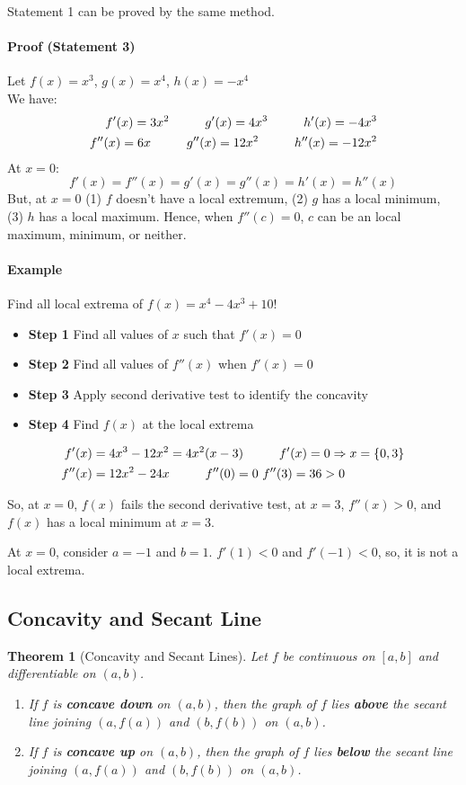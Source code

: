 \documentclass[12pt]{article}
\newcommand\tab[1][1cm]{\hspace*{#1}}
\newtheorem{theorem}{Theorem}
\begin{document}
Statement 1 can be proved by the same method.

\paragraph{Proof (Statement 3)}
Let $f(x) = x^3$, $g(x) = x^4$, $h(x) = -x^4$\\
We have:
\begin{align*} 
     f'(x) = 3x^2 \textrm{\tab} g'(x) = 4x^3 \textrm{\tab} h'(x) = -4x^3 \\
     f''(x) = 6x \textrm{\tab} g''(x) = 12x^2 \textrm{\tab} h''(x) = - 12x^2 \\
\end{align*}
At $x = 0$:
\[
    f'(x) = f''(x) = g'(x) = g''(x) = h'(x) = h''(x)
\]
But, at $x = 0$ (1) $f$ doesn't have a local extremum, (2) $g$ has a local minimum, (3) $h$ has a local maximum.
Hence, when $f''(c) = 0$, $c$ can be an local maximum, minimum, or neither. 
\paragraph{Example} Find all local extrema of $f(x) = x^4 - 4x^3 + 10$!
\begin{itemize} 
    \item \textbf{Step 1} Find all values of $x$ such that $f'(x) = 0$
    \item \textbf{Step 2} Find all values of $f''(x)$ when $f'(x) = 0$
    \item \textbf{Step 3} Apply second derivative test to identify the concavity
    \item \textbf{Step 4} Find $f(x)$ at the local extrema
\end{itemize}
\begin{align*} 
    f'(x) &= 4x^3 - 12x^2 = 4x^2(x - 3) \textrm{\tab} f'(x) = 0 \Rightarrow x = \{0, 3\} \\
    f''(x) &= 12x^2 - 24x \textrm{\tab} f''(0) = 0 \textrm{   } f''(3) = 36 > 0
\end{align*}

So, at $x = 0$, $f(x)$ fails the second derivative test, at $x = 3$, $f''(x) > 0$, and 
$f(x)$ has a local minimum at $x = 3$.  

At $x = 0$, consider $a = -1$ and $b = 1$. $f'(1) < 0$ and $f'(-1) < 0$, so, it is not a local extrema.
\subsection{Concavity and Secant Line}
\begin{theorem}[Concavity and Secant Lines]
    Let $f$ be continuous on $[a, b]$ and differentiable on $(a, b)$.
    \begin{enumerate} 
        \item If $f$ is \textbf{concave down} on $(a, b)$, then the graph of $f$ lies \textbf{above} the secant line joining $(a, f(a))$ and $(b, f(b))$ on $(a, b)$.
        \item  If $f$ is \textbf{concave up} on $(a, b)$, then the graph of $f$ lies \textbf{below} the secant line joining $(a, f(a))$ and $(b, f(b))$ on $(a, b)$.
    \end{enumerate}
\end{theorem}
\end{document}
